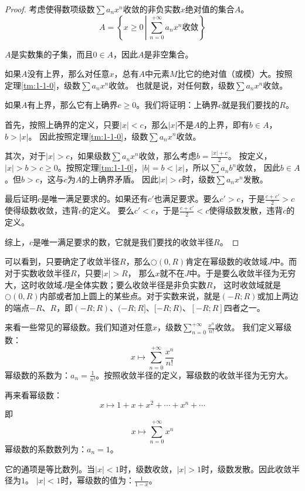 \documentclass[12pt,UTF8]{ctexbook}
\begin{document}
\begin{proof}
    考虑使得数项级数$\sum a_n x^n$收敛的非负实数$x$绝对值的集合$A$。
    $$A = \left\{ x \geqslant 0 \, \left| \, \sum_{n=0}^{+\infty} a_n x^n \mbox{收敛} \right. \right\} $$

    $A$是实数集的子集，而且$0\in A$，因此$A$是非空集合。

    如果$A$没有上界，那么对任意$x$，总有$A$中元素$M$比它的绝对值（或模）大。按照定理\ref{tm:1-1-0}，级数$\sum a_n x^n$收敛。
    也就是说，对任何数，级数$\sum a_n x^n$收敛。

    如果$A$有上界，那么它有上确界$c\geqslant 0$。我们将证明：上确界$c$就是我们要找的$R$。
    
    首先，按照上确界的定义，只要$|x|<c$，那么$|x|$不是$A$的上界，即有$b\in A$，$b>|x|$。
    因此按照定理\ref{tm:1-1-0}，级数$\sum a_n x^n$收敛。

    其次，对于$|x|>c$，如果级数$\sum a_n x^n$收敛，那么考虑$b = \frac{|x| + c}{2}$。
    按定义，$|x| > b > c \geqslant 0$。按照定理\ref{tm:1-1-0}，$|b| = b < |x|$，所以$\sum a_n b^n$收敛，
    因此$b \in A$。但$b>c$，这与$c$为$A$的上确界矛盾。
    因此$|x|>c$时，级数$\sum a_n x^n$发散。

    最后证明$c$是唯一满足要求的。如果还有$c'$也满足要求。要么$c'>c$，于是$\frac{c+c'}{2} > c$使得级数收敛，违背$c$的定义。
    要么$c'<c$，于是$\frac{c+c'}{2} < c$使得级数发散，违背$c$的定义。

    综上，$c$是唯一满足要求的数，它就是我们要找的收敛半径$R$。

\end{proof}

可以看到，只要确定了收敛半径$R$，那么$\bigcirc(0,R)$肯定在幂级数的收敛域$J$中。而对于实数收敛半径$R$，只要$|x|>R$，
那么$x$就不在$J$中。于是要么收敛半径为无穷大，这时收敛域$J$是全体实数；要么收敛半径是非负实数$R$，
这时收敛域就是$\bigcirc(0,R)$内部或者加上圆上的某些点。对于实数来说，就是$(-R;R)$或加上两边的端点$-R$、$R$，即$(-R;R)$、$(-R;R]$、$[-R;R)$、$[-R;R]$四者之一。

来看一些常见的幂级数。我们知道对任意$x$，级数$\sum_{n=0}^{+\infty} \frac{x^n}{n!}$收敛。
我们定义幂级数：
$$ x \mapsto \sum_{n=0}^{+\infty} \frac{x^n}{n!} $$
幂级数的系数为：$a_n = \frac{1}{n!}$。按照收敛半径的定义，幂级数的收敛半径为无穷大。

再来看幂级数：
$$ x \mapsto 1 + x + x^2 + \cdots + x^n + \cdots $$
即
$$ x \mapsto \sum_{n=0}^{+\infty} x^n $$
幂级数的系数数列为：$a_n = 1$。

它的通项是等比数列。当$|x|<1$时，级数收敛，$|x|>1$时，级数发散。因此收敛半径为$1$。
$|x|<1$时，幂级数的值为：$\frac{1}{1 - x}$。
\end{document}

